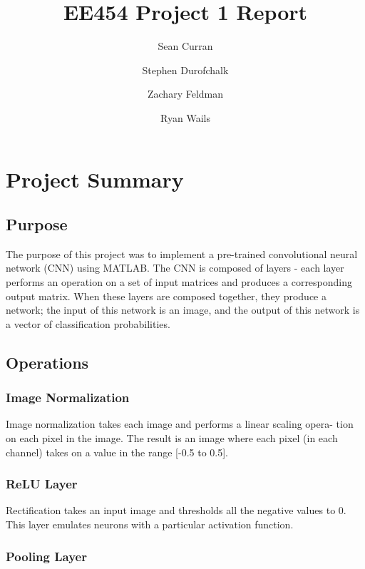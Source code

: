 \documentclass[11pt,english]{article}
\author{Sean Curran \\
\and Stephen Durofchalk \\
\and Zachary Feldman \\
\and Ryan Wails}
\title{EE454 Project 1 Report}
\begin{document}
\maketitle

\newpage
\section{Project Summary}

\subsection{Purpose}
The purpose of this project was to implement a pre-trained convolutional neural network (CNN) using MATLAB.  The CNN is composed of layers - each layer performs an operation on a set of input matrices and produces a corresponding output matrix.  When these layers are composed together, they produce a network; the input of this network is an image, and the output of this network is a vector of classification probabilities.

\subsection{Operations}

\subsubsection{Image Normalization}

Image normalization takes each image and performs a linear scaling opera-
tion on each pixel in the image. The result is an image where each pixel (in
each channel) takes on a value in the range [-0.5 to 0.5].



\subsubsection{ReLU Layer}

Rectification takes an input image and thresholds all the negative values to 0.  This layer emulates neurons with a particular activation function.



\subsubsection{Pooling Layer}
\end{document}
